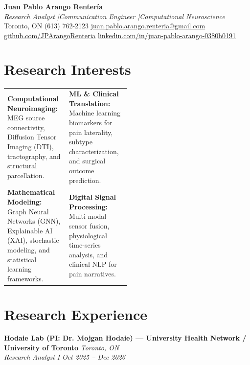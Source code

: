 \documentclass[11pt, letterpaper]{article}
\newcommand{\cventry}[4]{
    \noindent\textbf{#1} \hfill \textit{#2} \\
    \textit{#3} \hfill \textit{\small #4} \\
    \vspace{-4pt}
}
\begin{document}
\pagestyle{empty}

\begin{center}
    {\Huge \textbf{Juan Pablo Arango Rentería}} \\
    \vspace{6pt}
    {\color{secondary} \itshape Research Analyst \quad|\quad Communication Engineer \quad|\quad Computational Neuroscience} \\
    \vspace{6pt}
    {\small
    Toronto, ON \quad\textbar\quad
    (613) 762-2123 \quad\textbar\quad
    \href{mailto:juan.pablo.arango.renteria@gmail.com}{juan.pablo.arango.renteria@gmail.com} \\
    \href{https://github.com/JPArangoRenteria}{github.com/JPArangoRenteria} \quad\textbar\quad
    \href{https://linkedin.com/in/juan-pablo-arango-0380b0191}{linkedin.com/in/juan-pablo-arango-0380b0191}}
\end{center}

\vspace{8pt}

\section{Research Interests}

\begin{tabularx}{\linewidth}{@{}p{0.5\linewidth} X@{}}
    \textbf{Computational Neuroimaging:} MEG source connectivity, Diffusion Tensor Imaging (DTI), tractography, and structural parcellation. &
    \textbf{ML \& Clinical Translation:} Machine learning biomarkers for pain laterality, subtype characterization, and surgical outcome prediction. \\

    \textbf{Mathematical Modeling:} Graph Neural Networks (GNN), Explainable AI (XAI), stochastic modeling, and statistical learning frameworks. &
    \textbf{Digital Signal Processing:} Multi-modal sensor fusion, physiological time-series analysis, and clinical NLP for pain narratives.
\end{tabularx}

\section{Research Experience}

\cventry{Hodaie Lab (PI: Dr. Mojgan Hodaie) --- University Health Network / University of Toronto}{Toronto, ON}{Research Analyst I}{Oct 2025 -- Dec 2026}
\end{document}
